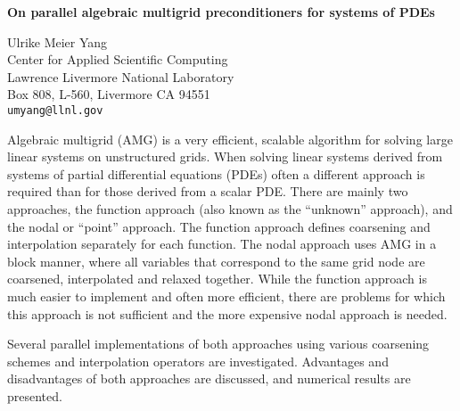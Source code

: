 \documentclass{report}
\begin{document}

\begin{center}
{\large
{\bf On parallel algebraic multigrid preconditioners for systems of PDEs}}

	Ulrike Meier Yang \\
	Center for Applied Scientific Computing \\
	Lawrence Livermore National Laboratory \\
	Box 808, L-560, Livermore CA 94551 \\
	{\tt umyang@llnl.gov}
\end{center}
Algebraic multigrid (AMG) is a very efficient, scalable
algorithm for solving large linear systems on unstructured
grids. When solving linear systems derived from systems of
partial differential equations (PDEs) often a different
approach is required than for those derived from a scalar
PDE. There are mainly two approaches, the function approach
(also known as the ``unknown'' approach), and the nodal or
``point'' approach. The function approach defines coarsening
and interpolation separately for each function. The nodal
approach uses AMG in a block manner, where all variables
that correspond to the same grid node are coarsened,
interpolated and relaxed together. While the function
approach is much easier to implement and often more
efficient, there are problems for which this approach is not
sufficient and the more expensive nodal approach is needed.


Several parallel implementations of both approaches using
various coarsening schemes and interpolation operators are
investigated. Advantages and disadvantages of both
approaches are discussed, and numerical results are
presented.



\end{document}
